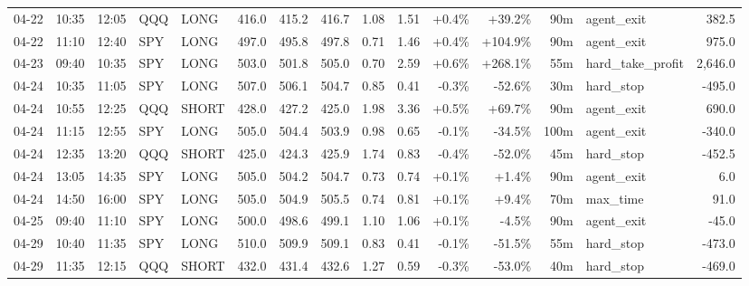 \documentclass[11pt,a4paper,twoside]{article}
\begin{document}
\begin{landscape}
\begin{center}
\begin{longtable}{>{\color{txtmain}}l l l l l r r r r r r r r >{\color{txtmain}}l r}
04-22 & 10:35 & 12:05 & QQQ & LONG & 416.0 & 415.2 & 416.7 & 1.08 & 1.51 & \textcolor{wingreen}{+0.4\%} & \textcolor{wingreen}{+39.2\%} & 90m & agent\_exit & \textcolor{wingreen}{382.5} \\
04-22 & 11:10 & 12:40 & SPY & LONG & 497.0 & 495.8 & 497.8 & 0.71 & 1.46 & \textcolor{wingreen}{+0.4\%} & \textcolor{wingreen}{+104.9\%} & 90m & agent\_exit & \textcolor{wingreen}{975.0} \\
04-23 & 09:40 & 10:35 & SPY & LONG & 503.0 & 501.8 & 505.0 & 0.70 & 2.59 & \textcolor{wingreen}{+0.6\%} & \textcolor{wingreen}{+268.1\%} & 55m & hard\_take\_profit & \textcolor{wingreen}{2,646.0} \\
04-24 & 10:35 & 11:05 & SPY & LONG & 507.0 & 506.1 & 504.7 & 0.85 & 0.41 & \textcolor{lossred}{-0.3\%} & \textcolor{lossred}{-52.6\%} & 30m & hard\_stop & \textcolor{lossred}{-495.0} \\
04-24 & 10:55 & 12:25 & QQQ & SHORT & 428.0 & 427.2 & 425.0 & 1.98 & 3.36 & \textcolor{wingreen}{+0.5\%} & \textcolor{wingreen}{+69.7\%} & 90m & agent\_exit & \textcolor{wingreen}{690.0} \\
04-24 & 11:15 & 12:55 & SPY & LONG & 505.0 & 504.4 & 503.9 & 0.98 & 0.65 & \textcolor{lossred}{-0.1\%} & \textcolor{lossred}{-34.5\%} & 100m & agent\_exit & \textcolor{lossred}{-340.0} \\
04-24 & 12:35 & 13:20 & QQQ & SHORT & 425.0 & 424.3 & 425.9 & 1.74 & 0.83 & \textcolor{lossred}{-0.4\%} & \textcolor{lossred}{-52.0\%} & 45m & hard\_stop & \textcolor{lossred}{-452.5} \\
04-24 & 13:05 & 14:35 & SPY & LONG & 505.0 & 504.2 & 504.7 & 0.73 & 0.74 & \textcolor{wingreen}{+0.1\%} & \textcolor{wingreen}{+1.4\%} & 90m & agent\_exit & \textcolor{wingreen}{6.0} \\
04-24 & 14:50 & 16:00 & SPY & LONG & 505.0 & 504.9 & 505.5 & 0.74 & 0.81 & \textcolor{wingreen}{+0.1\%} & \textcolor{wingreen}{+9.4\%} & 70m & max\_time & \textcolor{wingreen}{91.0} \\
04-25 & 09:40 & 11:10 & SPY & LONG & 500.0 & 498.6 & 499.1 & 1.10 & 1.06 & \textcolor{wingreen}{+0.1\%} & \textcolor{lossred}{-4.5\%} & 90m & agent\_exit & \textcolor{lossred}{-45.0} \\
04-29 & 10:40 & 11:35 & SPY & LONG & 510.0 & 509.9 & 509.1 & 0.83 & 0.41 & \textcolor{lossred}{-0.1\%} & \textcolor{lossred}{-51.5\%} & 55m & hard\_stop & \textcolor{lossred}{-473.0} \\
04-29 & 11:35 & 12:15 & QQQ & SHORT & 432.0 & 431.4 & 432.6 & 1.27 & 0.59 & \textcolor{lossred}{-0.3\%} & \textcolor{lossred}{-53.0\%} & 40m & hard\_stop & \textcolor{lossred}{-469.0} \\

\end{longtable}
\end{center}
\end{landscape}
\end{document}
